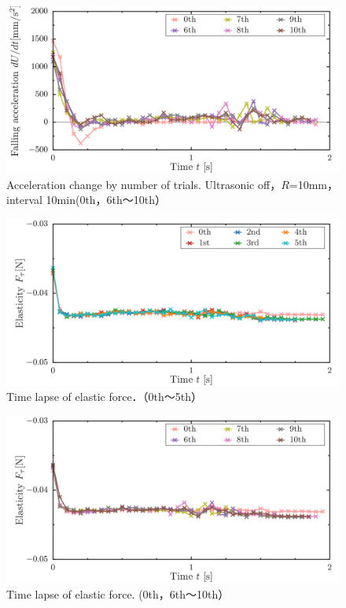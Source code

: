 \begin{figure}[ht]
    \begin{center}
        \includegraphics[width=15cm,clip]{5-Discussion/6-10-a.png}
        \caption{Acceleration change by number of trials. Ultrasonic off，$R$=10mm，interval 10min(0th，6th～10th）}
        \label{fig:6-10-a}
    \end{center}
\end{figure}
\begin{figure}[ht]
    \begin{center}
        \includegraphics[width=15cm,clip]{5-Discussion/1-5-ftau.png}
        \caption{Time lapse of elastic force．（0th～5th）}
        \label{fig:1-5-ftau}
    \end{center}
\end{figure}
\begin{figure}[ht]
    \begin{center}
        \includegraphics[width=15cm,clip]{5-Discussion/6-10-ftau.png}
        \caption{Time lapse of elastic force. (0th，6th～10th）}
        \label{fig:6-10-ftau}
    \end{center}
\end{figure}
